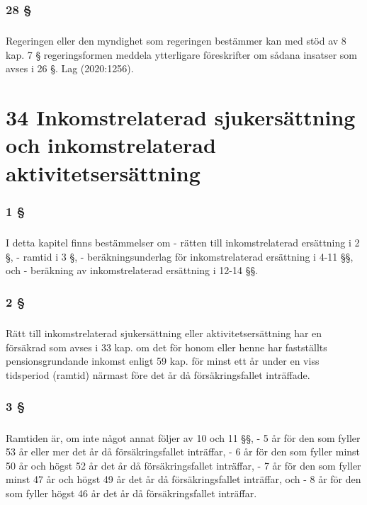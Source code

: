 \documentclass[a4paper,notitlepage,openany,10pt]{book}
\begin{document}
\subsection*{28 §}
\paragraph*{}
Regeringen eller den myndighet som regeringen bestämmer kan med stöd av 8 kap. 7 § regeringsformen meddela ytterligare föreskrifter om sådana insatser som avses i 26 §.
Lag (2020:1256).
\chapter*{34 Inkomstrelaterad sjukersättning och inkomstrelaterad aktivitetsersättning}
\subsection*{1 §}
\paragraph*{}
I detta kapitel finns bestämmelser om
\newline - rätten till inkomstrelaterad ersättning i 2 §,
\newline - ramtid i 3 §,
\newline - beräkningsunderlag för inkomstrelaterad ersättning i 4-11 §§, och
\newline - beräkning av inkomstrelaterad ersättning i 12-14 §§.
\subsection*{2 §}
\paragraph*{}
Rätt till inkomstrelaterad sjukersättning eller aktivitetsersättning har en försäkrad som avses i 33 kap. om det för honom eller henne har fastställts pensionsgrundande inkomst enligt 59 kap. för minst ett år under en viss tidsperiod (ramtid) närmast före det år då försäkringsfallet inträffade.
\subsection*{3 §}
\paragraph*{}
Ramtiden är, om inte något annat följer av 10 och 11 §§,
\newline - 5 år för den som fyller 53 år eller mer det år då försäkringsfallet inträffar,
\newline - 6 år för den som fyller minst 50 år och högst 52 år det år då försäkringsfallet inträffar,
\newline - 7 år för den som fyller minst 47 år och högst 49 år det år då försäkringsfallet inträffar, och
\newline - 8 år för den som fyller högst 46 år det år då försäkringsfallet inträffar.
\end{document}
